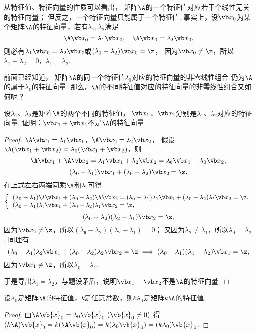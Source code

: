 从特征值、特征向量的性质可以看出，
矩阵\(\A\)的一个特征值对应若干个线性无关的特征向量；
但反之，一个特征向量只能属于一个特征值.
事实上，设\(\x_0\)为某个矩阵\(\A\)的特征向量，若有\(\lambda_1,\lambda_2\)满足\[
	\A\x_0=\lambda_1\x_0,
	\quad
	\A\x_0=\lambda_2\x_0,
\]
则必有\(\lambda_1\x_0=\lambda_2\x_0\)或\((\lambda_1-\lambda_2)\x_0=\z\)，
因为\(\x_0\neq\z\)，所以\(\lambda_1-\lambda_2=0\)，\(\lambda_1=\lambda_2\).

前面已经知道，
矩阵\(\A\)的同一个特征值\(\lambda_0\)对应的特征向量的非零线性组合
仍为\(\A\)的属于\(\lambda_0\)的特征向量.
那么，\(\A\)的不同特征值对应的特征向量的非零线性组合又如何呢？
\begin{example}
设\(\lambda_1\)、\(\lambda_2\)是矩阵\(\A\)的两个不同的特征值，
\(\x_1\)、\(\x_2\)分别是\(\lambda_1\)、\(\lambda_2\)对应的特征向量.
证明：\(\x_1+\x_2\)不是\(\A\)的特征向量.
\begin{proof}
\(\A\x_1 = \lambda_1\x_1\)，\(\A\x_2 = \lambda_2\x_2\)，
假设\(\A(\x_1+\x_2) = \lambda_0(\x_1+\x_2)\)，则\[
	\A\x_1+\A\x_2 =\lambda_1\x_1+\lambda_2\x_2 = \lambda_0\x_1+\lambda_0\x_2,
\]\[
	(\lambda_0-\lambda_1)\x_1+(\lambda_0-\lambda_2)\x_2 = \z,
\]
在上式左右两端同乘\(\A\)和\(\lambda_1\)可得\[
	\left\{ \begin{array}{l}
		(\lambda_0-\lambda_1)\A\x_1+(\lambda_0-\lambda_2)\A\x_2 = (\lambda_0-\lambda_1)\lambda_1\x_1 + (\lambda_0-\lambda_2)\lambda_2\x_2 = \z, \\
		(\lambda_0-\lambda_1)\lambda_1\x_1+(\lambda_0-\lambda_2)\lambda_1\x_2 = \z,
	\end{array} \right.
\]\[
	(\lambda_0-\lambda_2)(\lambda_2-\lambda_1)\x_2 = \z,
\]
因为\(\x_2\neq\z\)，所以\((\lambda_0-\lambda_2)(\lambda_2-\lambda_1)=0\)；
又因为\(\lambda_2\neq\lambda_1\)，所以\(\lambda_0=\lambda_2\).
同理有\[
	(\lambda_0-\lambda_1)\lambda_2\x_1+(\lambda_0-\lambda_2)\lambda_2\x_2 = \z
	\implies
	(\lambda_0-\lambda_1)(\lambda_1-\lambda_2)\x_1 = \z,
\]
因为\(\x_1\neq\z\)，所以\(\lambda_0=\lambda_1\).

于是导出\(\lambda_1=\lambda_2\)，与题设矛盾，说明\(\x_1+\x_2\)不是\(\A\)的特征向量.
\end{proof}
\end{example}

\begin{example}
设\(\lambda_0\)是矩阵\(\A\)的特征值，\(k\)是任意常数，则\(k\lambda_0\)是矩阵\(k\A\)的特征值.
\begin{proof}
由\(\A \vb{x}_0 = \lambda_0 \vb{x}_0\ (\vb{x}_0\neq0)\)
得\((k\A) \vb{x}_0
= k(\A \vb{x}_0)
= k(\lambda_0 \vb{x}_0)
= (k\lambda_0) \vb{x}_0\).
\end{proof}
\end{example}

